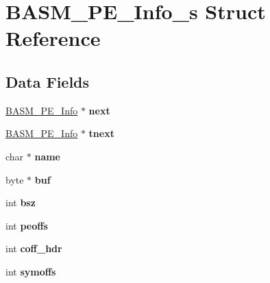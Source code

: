 \hypertarget{structBASM__PE__Info__s}{\section{B\-A\-S\-M\-\_\-\-P\-E\-\_\-\-Info\-\_\-s Struct Reference}
\label{structBASM__PE__Info__s}
}
\subsection*{Data Fields}
\begin{DoxyCompactItemize}
\item 
\hypertarget{structBASM__PE__Info__s_a7984363a5f2394229902a32d746c28e3}{\hyperlink{structBASM__PE__Info__s}{B\-A\-S\-M\-\_\-\-P\-E\-\_\-\-Info} $\ast$ {\bfseries next}}\label{structBASM__PE__Info__s_a7984363a5f2394229902a32d746c28e3}

\item 
\hypertarget{structBASM__PE__Info__s_a6ce48d21e951afcf60dd54c6e5ce82ca}{\hyperlink{structBASM__PE__Info__s}{B\-A\-S\-M\-\_\-\-P\-E\-\_\-\-Info} $\ast$ {\bfseries tnext}}\label{structBASM__PE__Info__s_a6ce48d21e951afcf60dd54c6e5ce82ca}

\item 
\hypertarget{structBASM__PE__Info__s_a860cd717570e2d82c32c0f3bc2406e10}{char $\ast$ {\bfseries name}}\label{structBASM__PE__Info__s_a860cd717570e2d82c32c0f3bc2406e10}

\item 
\hypertarget{structBASM__PE__Info__s_ac4740a3128cb5d13f444307f6a99b133}{byte $\ast$ {\bfseries buf}}\label{structBASM__PE__Info__s_ac4740a3128cb5d13f444307f6a99b133}

\item 
\hypertarget{structBASM__PE__Info__s_ad9770160d0042d1274a11395086ae94f}{int {\bfseries bsz}}\label{structBASM__PE__Info__s_ad9770160d0042d1274a11395086ae94f}

\item 
\hypertarget{structBASM__PE__Info__s_ae55249c8d4ccce1ba0500ad8a8f4035e}{int {\bfseries peoffs}}\label{structBASM__PE__Info__s_ae55249c8d4ccce1ba0500ad8a8f4035e}

\item 
\hypertarget{structBASM__PE__Info__s_a03342a6c29758149036091d022207f96}{int {\bfseries coff\-\_\-hdr}}\label{structBASM__PE__Info__s_a03342a6c29758149036091d022207f96}

\item 
\hypertarget{structBASM__PE__Info__s_aaceeb08176e10e996624a4b17d27fd7a}{int {\bfseries symoffs}}\label{structBASM__PE__Info__s_aaceeb08176e10e996624a4b17d27fd7a}


\end{DoxyCompactItemize}
